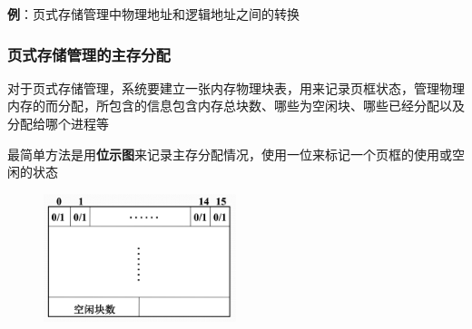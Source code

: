 \documentclass[cs4size,a4paper,10pt]{ctexart}
\begin{document}
		\textbf{例}：页式存储管理中物理地址和逻辑地址之间的转换
		\begin{figure}[H]
			\centering
		\end{figure}

		\subsubsection{页式存储管理的主存分配}
		对于页式存储管理，系统要建立一张内存物理块表，用来记录页框状态，管理物理内存的而分配，所包含的信息包含内存总块数、哪些为空闲块、哪些已经分配以及分配给哪个进程等

		最简单方法是用\textbf{位示图}来记录主存分配情况，使用一位来标记一个页框的使用或空闲的状态
		
		\begin{figure}[H]
			\centering
			\includegraphics[width=0.5\textwidth]{img/3.3.1.2}
		\end{figure}
\end{document}
